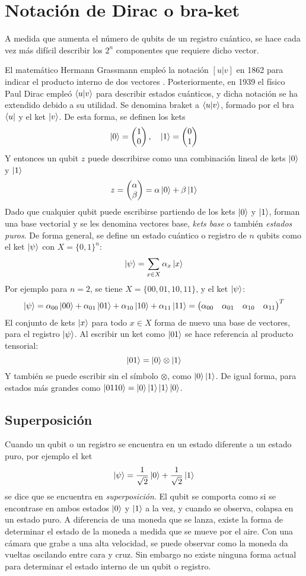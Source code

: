 \section{Notación de Dirac o bra-ket}
A medida que aumenta el número de qubits de un registro cuántico, se hace cada 
vez más difícil describir los $2^n$ componentes que requiere dicho vector.

El matemático Hermann Grassmann empleó la notación $[u|v]$ en 1862 para indicar 
el producto interno de dos vectores \cite{cajori-grassmann}. Posteriormente, en 
1939 el físico Paul Dirac empleó $\braket{u|v}$ para describir estados 
cuánticos, y dicha notación se ha extendido debido a su utilidad. Se denomina 
braket a $\braket{u|v}$, formado por el bra $\bra{u}$ y el ket $\ket{v}$.
%
De esta forma, se definen los kets
$$ \ket{0} = \begin{pmatrix} 1 \\ 0 \end{pmatrix}, \quad \ket{1} = \begin{pmatrix} 0 \\ 1 \end{pmatrix} $$
%
Y entonces un qubit $z$ puede describirse como una combinación lineal de kets 
$\ket{0}$ y $\ket{1}$
$$ z = \begin{pmatrix} \alpha \\ \beta \end{pmatrix} = \alpha \ket{0} + \beta \ket{1}$$
Dado que cualquier qubit puede escribirse partiendo de los kets $\ket{0}$ y 
$\ket{1}$, forman una base vectorial y se les denomina vectores base, 
\textit{kets base} o también \textit{estados puros}.
%
De forma general, se define un estado cuántico o registro de $n$ qubits como el 
ket $\ket{\psi}$ con $X = \{0,1\}^n$:
$$ \ket{\psi} = \sum_{x \in X} \alpha_x \ket{x} $$
Por ejemplo para $n = 2$, se tiene $X = \{00, 01, 10, 11\}$, y el ket 
$\ket{\psi}$:
$$ \ket{\psi} = \alpha_{00} \ket{00} + \alpha_{01} \ket{01}
+ \alpha_{10} \ket{10} + \alpha_{11} \ket{11} =
\begin{pmatrix} \alpha_{00} & \alpha_{01} & \alpha_{10} & \alpha_{11} \end{pmatrix}^T $$
El conjunto de kets $\ket{x}$ para todo $x \in X$ forma de nuevo una base de 
vectores, para el registro $\ket{\psi}$. Al escribir un ket como $\ket{01}$ se 
hace referencia al producto tensorial:
$$ \ket{01} = \ket{0} \otimes \ket{1} $$
Y también se puede escribir sin el símbolo $\otimes$, como $\ket{0}\ket{1}$. De 
igual forma, para estados más grandes como $\ket{0110} = 
\ket{0}\ket{1}\ket{1}\ket{0}$.

\subsection{Superposición}

Cuando un qubit o un registro se encuentra en un estado diferente a un estado 
puro, por ejemplo el ket
$$\ket{\psi} = \frac{1}{\sqrt{2}} \ket{0} + \frac{1}{\sqrt{2}} \ket{1} $$
se dice que se encuentra en \textit{superposición}. El qubit se comporta como si 
se encontrase en ambos estados $\ket{0}$ y $\ket{1}$ a la vez, y cuando se 
observa, colapsa en un estado puro. A diferencia de una moneda que se lanza, 
existe la forma de determinar el estado de la moneda a medida que se mueve por 
el aire. Con una cámara que grabe a una alta velocidad, se puede observar como 
la moneda da vueltas oscilando entre cara y cruz. Sin embargo no existe ninguna 
forma actual para determinar el estado interno de un qubit o registro.

